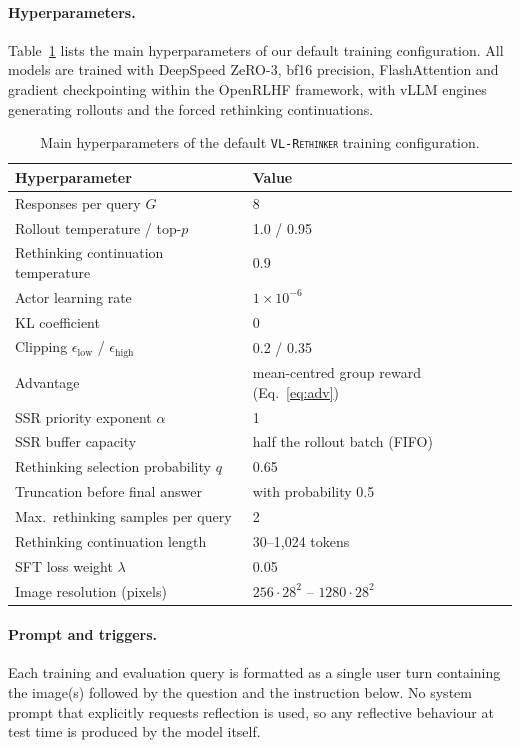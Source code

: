 \documentclass{article}
\newcommand{\model}{\texttt{\textsc{VL-Rethinker}}\xspace}
\begin{document}
\paragraph{Hyperparameters.} Table~\ref{tab:hparams} lists the main hyperparameters of our default training configuration. All models are trained with DeepSpeed ZeRO-3, bf16 precision, FlashAttention and gradient checkpointing within the OpenRLHF framework, with vLLM engines generating rollouts and the forced rethinking continuations.

\begin{table}[h]
\centering
\small
\begin{tabular}{ll}
\toprule
\textbf{Hyperparameter} & \textbf{Value} \\
\midrule
Responses per query $G$ & 8 \\
Rollout temperature / top-$p$ & 1.0 / 0.95 \\
Rethinking continuation temperature & 0.9 \\
Actor learning rate & $1\times10^{-6}$ \\
KL coefficient & 0 \\
Clipping $\epsilon_\mathrm{low}$ / $\epsilon_\mathrm{high}$ & 0.2 / 0.35 \\
Advantage & mean-centred group reward (Eq.~\ref{eq:adv}) \\
SSR priority exponent $\alpha$ & 1 \\
SSR buffer capacity & half the rollout batch (FIFO) \\
Rethinking selection probability $q$ & 0.65 \\
Truncation before final answer & with probability 0.5 \\
Max.\ rethinking samples per query & 2 \\
Rethinking continuation length & 30--1,024 tokens \\
SFT loss weight $\lambda$ & 0.05 \\
Image resolution (pixels) & $256\cdot28^2$ -- $1280\cdot28^2$ \\
\bottomrule
\end{tabular}
\caption{\small Main hyperparameters of the default \model training configuration.}
\label{tab:hparams}
\end{table}

\paragraph{Prompt and triggers.} Each training and evaluation query is formatted as a single user turn containing the image(s) followed by the question and the instruction below. No system prompt that explicitly requests reflection is used, so any reflective behaviour at test time is produced by the model itself.
\end{document}
